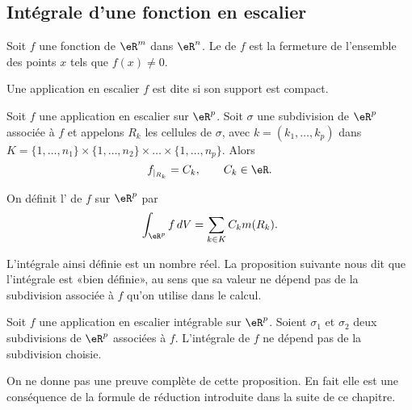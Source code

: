 \subsection{Intégrale d'une fonction en escalier}

\begin{definition}
  Soit $f$ une fonction de $\eR^m$ dans $\eR^n$. Le  de $f$ est la fermeture de l'ensemble des points $x$ tels que $f(x)\neq 0$. 
\end{definition}
\begin{definition}
Une application en escalier $f$ est dite  si son support est compact. 
\end{definition} 
Soit $f$ une application en escalier sur $\eR^p$. Soit $\sigma$ une subdivision de  $\eR^p$ associée à $f$ et appelons $R_k$ les cellules de $\sigma$, avec $k=(k_1,\ldots,k_p)$ dans $ K=\{1,\ldots,n_1\}\times\{1,\ldots,n_2\}\times\ldots \times\{1,\ldots,n_p\}$. Alors  
\[
f_{\vert_{R_k}}=C_k, \qquad C_k\in\eR.
\]

\begin{definition} 
On définit l' de $f$ sur $\eR^p$ par
\[
\int_{\eR^p}f\,dV=\sum_{k\in K}C_km(R_k).
\] 
\end{definition}
L'intégrale ainsi définie est un nombre réel. La proposition suivante nous dit que l'intégrale est «bien définie», au sens que sa valeur ne dépend pas de la subdivision associée à $f$ qu'on utilise dans le calcul. 
\begin{proposition}
Soit $f$ une application en escalier intégrable sur $\eR^p$. Soient $\sigma_1$ et $\sigma_2$ deux subdivisions de $\eR^p$ associées à  $f$. L'intégrale de $f$ ne dépend pas de la subdivision choisie.
\end{proposition}
On ne donne pas une preuve complète de cette proposition. En fait elle est une conséquence de la formule de réduction introduite dans la suite de ce chapitre.  


